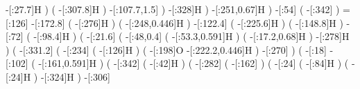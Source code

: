 {                       -[:27.7]H%
                              )
                              (
                      -[:307.8]H%
                              )
              -[:107.7,1.5]%
                          )
                -[:328]H%
                      )
       -[:251,0.67]H%
                  )
         -[:54]%
                  (
            -[:342]%
                  )
        =[:126]%
      -[:172.8]%
                  (
            -[:276]H%
                  )
                  (
      -[:248,0.446]H%
                  )
      -[:122.4]%
                  (
          -[:225.6]H%
                  )
                  (
          -[:148.8]H%
                  )
         -[:72]%
                  (
           -[:98.4]H%
                  )
                  (
           -[:21.6]%
                      (
             -[:48,0.4]%
                          (
             -[:53.3,0.591]H%
                          )
                          (
              -[:17.2,0.68]H%
                          )
                -[:278]H%
                      )
                      (
              -[:331.2]%
                          (
                    -[:234]%
                              (
                        -[:126]H%
                              )
                              (
                        -[:198]O%
                -[:222.2,0.446]H%
                              )
                    -[:270]%
                          )
                          (
                     -[:18]%
                    -[:102]%
                              (
                  -[:161,0.591]H%
                              )
                              (
                        -[:342]%
                                  (
                             -[:42]H%
                                  )
                                  (
                            -[:282]%
                                      (
                                -[:162]%
                                      )
                                      (
                                 -[:24]%
                                          (
                                     -[:84]H%
                                          )
                                          (
                                     -[:24]H%
                                          )
                                -[:324]H%
                                      )
                            -[:306]%
}
